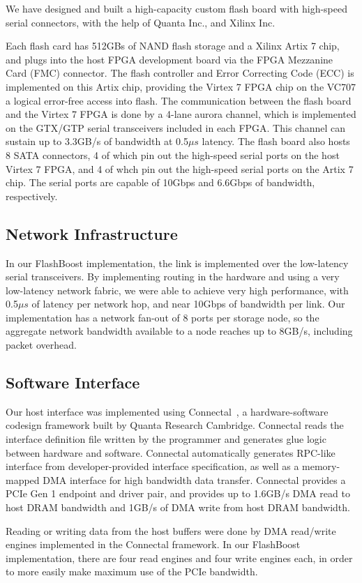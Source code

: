 We have designed and built a high-capacity custom flash board with high-speed
serial connectors, with the help of Quanta Inc., and Xilinx Inc.

Each flash card has 512GBs of NAND flash storage and a Xilinx Artix 7 chip, and
plugs into the host FPGA development board via the FPGA Mezzanine Card (FMC)
connector. The flash controller and Error Correcting Code (ECC) is implemented
on this Artix chip, providing the Virtex 7 FPGA chip on the VC707 a logical
error-free access into flash. The communication between the flash board and the
Virtex 7 FPGA is done by a 4-lane aurora channel, which is implemented on the
GTX/GTP serial transceivers included in each FPGA. This channel can sustain up
to 3.3GB/s of bandwidth at 0.5$\mu s$ latency.
The flash board also hosts 8 SATA connectors, 4 of
which pin out the high-speed serial ports on the host Virtex 7 FPGA,
and 4 of whch pin out the high-speed serial ports on the Artix 7 chip.
The serial ports are capable of 10Gbps and 6.6Gbps of bandwidth, respectively.

\subsection{Network Infrastructure}

In our FlashBoost implementation, the link is implemented over the
low-latency serial transceivers.  By
implementing routing in the hardware and using a very low-latency network
fabric, we were able to achieve very high performance, with 0.5$\mu s$ of
latency per network hop, and near 10Gbps of bandwidth per link. Our
implementation has a network fan-out of 8 ports per storage node, so the
aggregate network bandwidth available to a node reaches up to 8GB/s, including
packet overhead.

\subsection{Software Interface}

Our host interface was implemented using Connectal~\cite{connectal}, a
hardware-software codesign framework built by Quanta Research Cambridge.
Connectal reads the interface definition file written by the programmer and
generates glue logic between hardware and software. Connectal automatically
generates RPC-like interface from developer-provided interface specification, as
well as a memory-mapped DMA interface for high bandwidth data transfer.
Connectal provides a PCIe Gen 1 endpoint and driver pair, and provides up to
1.6GB/s DMA read to host DRAM bandwidth and 1GB/s of DMA write from host DRAM
bandwidth. 

Reading or writing data from the host buffers were done by DMA read/write
engines implemented in the Connectal framework. In our FlashBoost
implementation, there are four read engines and four write engines each, in
order to more easily make maximum use of the PCIe bandwidth. 



